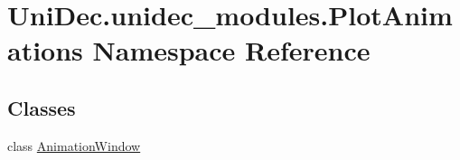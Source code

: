 \hypertarget{namespace_uni_dec_1_1unidec__modules_1_1_plot_animations}{}\section{Uni\+Dec.\+unidec\+\_\+modules.\+Plot\+Animations Namespace Reference}
\label{namespace_uni_dec_1_1unidec__modules_1_1_plot_animations}
\subsection*{Classes}
\begin{DoxyCompactItemize}
\item 
class \hyperlink{class_uni_dec_1_1unidec__modules_1_1_plot_animations_1_1_animation_window}{Animation\+Window}
\end{DoxyCompactItemize}
